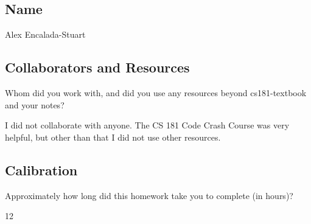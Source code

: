 \documentclass[submit]{harvardml}
\begin{document}
\newpage
\subsection*{Name}

Alex Encalada-Stuart

\subsection*{Collaborators and Resources}
Whom did you work with, and did you use any resources beyond cs181-textbook and your notes?

I did not collaborate with anyone. The CS 181 Code Crash Course was very helpful, but other than that I did not use other resources.

\subsection*{Calibration}
Approximately how long did this homework take you to complete (in hours)? 

12
\end{document}
